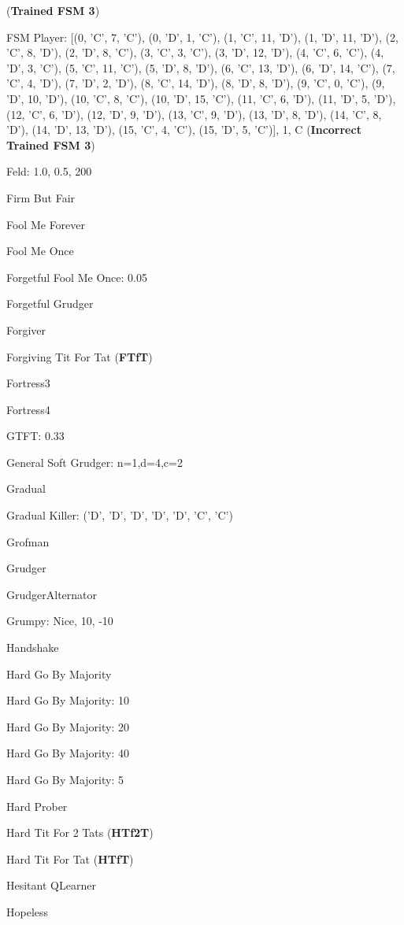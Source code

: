 (\textbf{Trained FSM 3})\item FSM Player: [(0, 'C', 7, 'C'), (0, 'D', 1, 'C'), (1, 'C', 11, 'D'), (1, 'D', 11, 'D'), (2, 'C', 8, 'D'), (2, 'D', 8, 'C'), (3, 'C', 3, 'C'), (3, 'D', 12, 'D'), (4, 'C', 6, 'C'), (4, 'D', 3, 'C'), (5, 'C', 11, 'C'), (5, 'D', 8, 'D'), (6, 'C', 13, 'D'), (6, 'D', 14, 'C'), (7, 'C', 4, 'D'), (7, 'D', 2, 'D'), (8, 'C', 14, 'D'), (8, 'D', 8, 'D'), (9, 'C', 0, 'C'), (9, 'D', 10, 'D'), (10, 'C', 8, 'C'), (10, 'D', 15, 'C'), (11, 'C', 6, 'D'), (11, 'D', 5, 'D'), (12, 'C', 6, 'D'), (12, 'D', 9, 'D'), (13, 'C', 9, 'D'), (13, 'D', 8, 'D'), (14, 'C', 8, 'D'), (14, 'D', 13, 'D'), (15, 'C', 4, 'C'), (15, 'D', 5, 'C')], 1, C
(\textbf{Incorrect Trained FSM 3})\item Feld: 1.0, 0.5, 200
\item Firm But Fair
\item Fool Me Forever
\item Fool Me Once
\item Forgetful Fool Me Once: 0.05
\item Forgetful Grudger
\item Forgiver
\item Forgiving Tit For Tat
(\textbf{FTfT})\item Fortress3
\item Fortress4
\item GTFT: 0.33
\item General Soft Grudger: n=1,d=4,c=2
\item Gradual
\item Gradual Killer: ('D', 'D', 'D', 'D', 'D', 'C', 'C')
\item Grofman
\item Grudger
\item GrudgerAlternator
\item Grumpy: Nice, 10, -10
\item Handshake
\item Hard Go By Majority
\item Hard Go By Majority: 10
\item Hard Go By Majority: 20
\item Hard Go By Majority: 40
\item Hard Go By Majority: 5
\item Hard Prober
\item Hard Tit For 2 Tats
(\textbf{HTf2T})\item Hard Tit For Tat
(\textbf{HTfT})\item Hesitant QLearner
\item Hopeless
